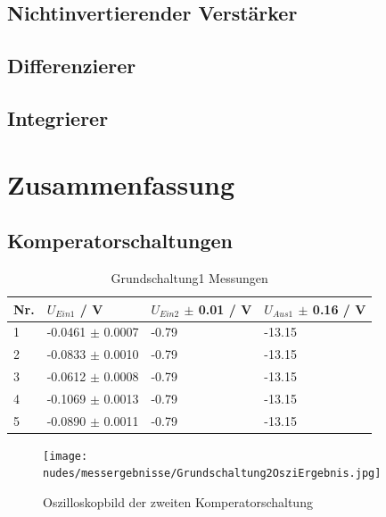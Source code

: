 \documentclass[12pt,a4paper,twoside]{article}
\begin{document}
\subsection{Nichtinvertierender Verstärker}



\subsection{Differenzierer}



\subsection{Integrierer}




\section{Zusammenfassung} %

\subsection{Komperatorschaltungen}

\begin{table}[H]
    \centering
    \caption{Grundschaltung1 Messungen}
    \label{tab:Grundschaltung1MessungenAW}
    \begin{tabular}{| l | l | l | l |}
        \hline
        Nr. & $U_{Ein1}$ / V & $U_{Ein2}$ $\pm$ 0.01 / V & $U_{Aus1}$ $\pm$ 0.16 / V \\
        \hline
        1 & -0.0461 $\pm$ 0.0007 & -0.79 & -13.15 \\
        2 & -0.0833 $\pm$ 0.0010 & -0.79 & -13.15 \\
        3 & -0.0612 $\pm$ 0.0008 & -0.79 & -13.15 \\
        4 & -0.1069 $\pm$ 0.0013 & -0.79 & -13.15 \\
        5 & -0.0890 $\pm$ 0.0011 & -0.79 & -13.15 \\
        \hline
    \end{tabular}
\end{table}

\begin{figure}[H]
    \centering
    \texttt{[image: nudes/messergebnisse/Grundschaltung2OsziErgebnis.jpg]}
    \caption{Oszilloskopbild der zweiten Komperatorschaltung}
    \label{fig:Grundschaltung2ErgebnissAW}
\end{figure}
\end{document}
